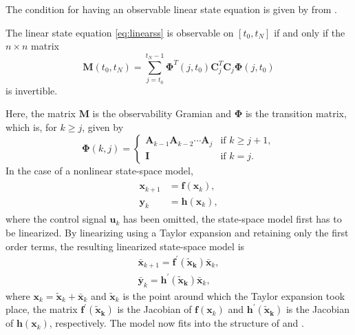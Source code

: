 The condition for having an observable linear state equation is given by  from \cite{Rugh:1996}.
%
\begin{theorem}
\label{th:observability}
	The linear state equation \eqref{eq:linearss} is observable on $[t_0, t_N]$ if and only if the $n \times n$ matrix
	\begin{equation}
	\label{eq:observabilitytheorem}
		\bm{M}(t_0,t_N) = \sum_{j=t_0}^{t_N-1} \bm{\Phi}^T(j,t_0)\bm{C}^T_j\bm{C}_j\bm{\Phi}(j,t_0)
	\end{equation}
	is invertible.
\end{theorem}
%
Here, the matrix $\bm{M}$ is the observability Gramian and $\bm{\Phi}$ is the transition matrix, which is, for $k \ge j$, given by
%
\begin{equation}
	\bm{\Phi}(k,j) =
		\begin{cases}
			\bm{A}_{k-1} \bm{A}_{k-2} \cdots \bm{A}_j & \text{if } k \ge j+1, \\
			\bm{I} & \text{if } k = j.
		\end{cases}
\end{equation}
%
In the case of a nonlinear state-space model,
%
\begin{align}
\label{eq:nlss}
\begin{split}
	\bm{x}_{k+1} &= \bm{f}(\bm{x}_k), \\
	\bm{y}_k &= \bm{h}(\bm{x}_k),
\end{split}
\end{align}
%
where the control signal $\bm{u}_k$ has been omitted, the state-space model first has to be linearized.
By linearizing using a Taylor expansion and retaining only the first order terms, the resulting linearized state-space model is
%
\begin{equation}
\begin{split}
	\bar{\bm{x}}_{k+1} = \bm{f}^\prime(\bm{\tilde{\bm{x}}_k}) \bar{\bm{x}}_k, \\
	\bar{\bm{y}}_{k} = \bm{h}^\prime(\bm{\tilde{\bm{x}}_k}) \bar{\bm{x}}_k,
\end{split}
\end{equation}
%
where $\bm{x}_k = \tilde{\bm{x}}_k + \bar{\bm{x}}_k$ and $\tilde{\bm{x}}_k$ is the point around which the Taylor expansion took place, the matrix $\bm{f}^\prime(\bm{\tilde{\bm{x}}_k})$ is the Jacobian of $\bm{f}(\bm{x}_k)$ and $\bm{h}^\prime(\bm{\tilde{\bm{x}}_k})$ is the Jacobian of $\bm{h}(\bm{x}_k)$, respectively.
The model now fits into the structure of  and .
